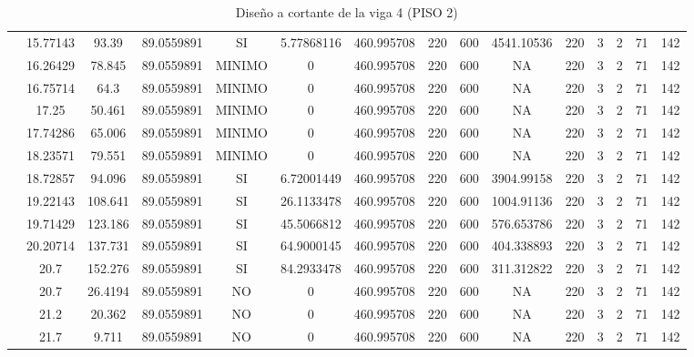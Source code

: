 \begin{table}[H]
{\begin{tabular}{|c|c|c|c|c|c|c|c|c|c|c|c|c|c|c|}
\cline{2-15}    & 15.77143 & 93.39 & 89.0559891 & SI  & 5.77868116 & 460.995708 & 220 & 600 & 4541.10536 & 220 & 3   & 2   & 71  & 142 \bigstrut\\
\cline{2-15}    & 16.26429 & 78.845 & 89.0559891 & MINIMO & 0   & 460.995708 & 220 & 600 & NA  & 220 & 3   & 2   & 71  & 142 \bigstrut\\
\cline{2-15}    & 16.75714 & 64.3 & 89.0559891 & MINIMO & 0   & 460.995708 & 220 & 600 & NA  & 220 & 3   & 2   & 71  & 142 \bigstrut\\
\cline{2-15}    & 17.25 & 50.461 & 89.0559891 & MINIMO & 0   & 460.995708 & 220 & 600 & NA  & 220 & 3   & 2   & 71  & 142 \bigstrut\\
\cline{2-15}    & 17.74286 & 65.006 & 89.0559891 & MINIMO & 0   & 460.995708 & 220 & 600 & NA  & 220 & 3   & 2   & 71  & 142 \bigstrut\\
\cline{2-15}    & 18.23571 & 79.551 & 89.0559891 & MINIMO & 0   & 460.995708 & 220 & 600 & NA  & 220 & 3   & 2   & 71  & 142 \bigstrut\\
\cline{2-15}    & 18.72857 & 94.096 & 89.0559891 & SI  & 6.72001449 & 460.995708 & 220 & 600 & 3904.99158 & 220 & 3   & 2   & 71  & 142 \bigstrut\\
\cline{2-15}    & 19.22143 & 108.641 & 89.0559891 & SI  & 26.1133478 & 460.995708 & 220 & 600 & 1004.91136 & 220 & 3   & 2   & 71  & 142 \bigstrut\\
\cline{2-15}    & 19.71429 & 123.186 & 89.0559891 & SI  & 45.5066812 & 460.995708 & 220 & 600 & 576.653786 & 220 & 3   & 2   & 71  & 142 \bigstrut\\
\cline{2-15}    & 20.20714 & 137.731 & 89.0559891 & SI  & 64.9000145 & 460.995708 & 220 & 600 & 404.338893 & 220 & 3   & 2   & 71  & 142 \bigstrut\\
\cline{2-15}    & 20.7 & 152.276 & 89.0559891 & SI  & 84.2933478 & 460.995708 & 220 & 600 & 311.312822 & 220 & 3   & 2   & 71  & 142 \bigstrut\\
\cline{2-15}    & 20.7 & 26.4194 & 89.0559891 & NO  & 0   & 460.995708 & 220 & 600 & NA  & 220 & 3   & 2   & 71  & 142 \bigstrut\\
\cline{2-15}    & 21.2 & 20.362 & 89.0559891 & NO  & 0   & 460.995708 & 220 & 600 & NA  & 220 & 3   & 2   & 71  & 142 \bigstrut\\
\cline{2-15}    & 21.7 & 9.711 & 89.0559891 & NO  & 0   & 460.995708 & 220 & 600 & NA  & 220 & 3   & 2   & 71  & 142 \bigstrut\\
\hline
\end{tabular}%



  }%
    \caption{Diseño a cortante de la viga 4 (PISO 2) }
  \label{tab:C VG4 P2 }%
\end{table}%
